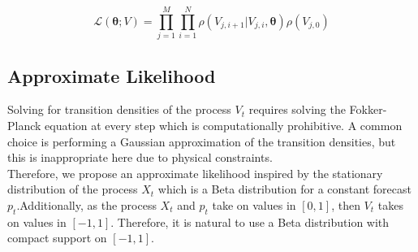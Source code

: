 \documentclass[10pt,twocolumn,letterpaper]{article}
\newcommand{\E}{\mathbb{E}}
\newcommand{\V}{\mathbb{V}}
\begin{document}
\begin{equation}
\mathcal{L}(\bm{\theta};V) =\prod\limits_{j=1}^M \prod\limits_{i=1}^N \rho ( {V_{j,i+1}|V_{j,i}}, \bm{\theta})  \rho (V_{j,0}) 
\label{likelihood}
\end{equation}

\subsection{Approximate Likelihood}
Solving for transition densities of the process $V_t$ requires solving the Fokker-Planck equation at every step which is computationally prohibitive. A common choice is performing a  Gaussian approximation of the transition densities, but this is inappropriate here due to physical constraints. \\

Therefore, we propose an approximate likelihood inspired by the stationary distribution of the process $X_t$ which is a Beta distribution for a constant forecast $p_t$.Additionally,  as the process $X_t$ and $p_t$ take on values in $[0,1]$, then $V_t$ takes on values in $[-1,1]$. Therefore,  it is natural to use a  Beta distribution with compact support on $[-1,1]$.

%
\end{document}
